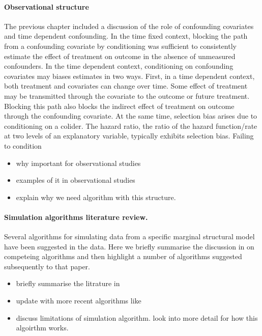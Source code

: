 \documentclass[11pt]{article}
\providecommand{\tightlist}{%
      \setlength{\itemsep}{0pt}\setlength{\parskip}{0pt}}
\begin{document}
    \paragraph{Observational structure}\label{observational-structure}

The previous chapter included a discussion of the role of confounding
covariates and time dependent confounding. In the time fixed context,
blocking the path from a confounding covariate by conditioning was
sufficient to consistently estimate the effect of treatment on outcome
in the absence of unmeasured confounders. In the time dependent context,
conditioning on confounding covariates may biases estimates in two ways.
First, in a time dependent context, both treatment and covariates can
change over time. Some effect of treatment may be transmitted through
the covariate to the outcome or future treatment. Blocking this path
also blocks the indirect effect of treatment on outcome through the
confounding covariate. At the same time, selection bias arises due to
conditioning on a colider. The hazard ratio, the ratio of the hazard
function/rate at two levels of an explanatory variable, typically
exhibits selection bias. Failing to condition \linebreak 

\begin{itemize}
\tightlist
\item
  why important for observational studies
\item
  examples of it in observational studies
\item
  explain why we need algorithm with this structure.
\end{itemize}

    \paragraph{Simulation algorithms literature
review.}\label{simulation-algorithms-literature-review.}

Several algorithms for simulating data from a specific marginal
structural model have been suggested in the data. Here we briefly
summarise the discussion in \citet{Havercroft2012} on competeing
algorithms and then highlight a number of algorithms suggested
subsequently to that paper.

\begin{itemize}
\tightlist
\item
  briefly summarise the litrature in \citet{Havercroft2012}
\item
  update with more recent algorithms like \citet{Young2014}
\item
  discuss \citet{Naimi2011} limitations of simulation algorithm. look
  into more detail for how this algoirthm works.
\end{itemize}
\end{document}
